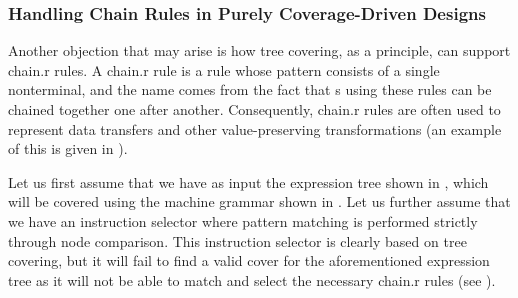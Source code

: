\subsubsection{Handling Chain Rules in Purely Coverage-Driven Designs}

Another objection that may arise is how \gls{tree covering}, as a
\gls{principle}, can support \gls{chain.r} \glspl{rule}.
%
A \gls{chain.r} \gls{rule} is a \gls{rule} whose \gls{pattern} consists of a
single \gls{nonterminal}, and the name comes from the fact that s using these \glspl{rule} can be chained together one after
another.
%
Consequently, \gls{chain.r} \glspl{rule} are often used to represent data
transfers and other value-preserving transformations (an example of this is
given in ).

Let us first assume that we have as input the \gls{expression tree} shown in
, which will be covered using the
\gls{machine grammar} shown in .
%
Let us further assume that we have an \gls{instruction selector} where
\gls{pattern matching} is performed strictly through \gls{node} comparison.
%
This \gls{instruction selector} is clearly based on \gls{tree covering}, but it
will fail to find a valid cover for the aforementioned \gls{expression tree} as
it will not be able to match and select the necessary \gls{chain.r} \glspl{rule}
(see ).


